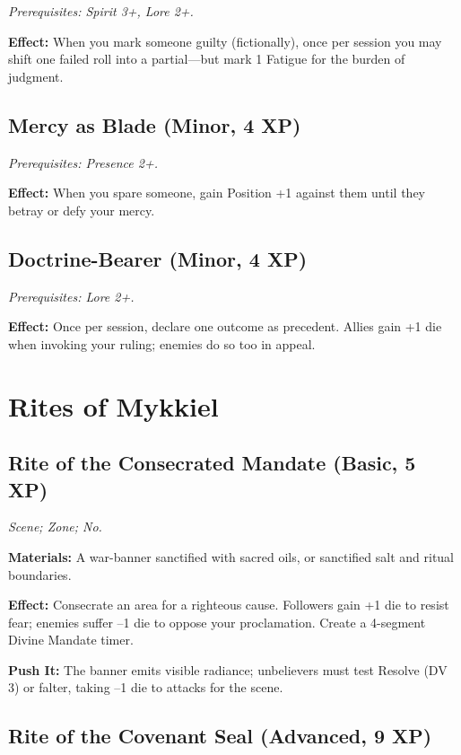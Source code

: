 \documentclass{book}
\begin{document}
\emph{Prerequisites: Spirit 3+, Lore 2+.}

\textbf{Effect:} When you mark someone guilty (fictionally), once per session you may shift one failed roll into a partial---but mark 1 Fatigue for the burden of judgment.

\subsection{Mercy as Blade (Minor, 4 XP)}

\emph{Prerequisites: Presence 2+.}

\textbf{Effect:} When you spare someone, gain Position +1 against them until they betray or defy your mercy.

\subsection{Doctrine-Bearer (Minor, 4 XP)}

\emph{Prerequisites: Lore 2+.}

\textbf{Effect:} Once per session, declare one outcome as precedent. Allies gain +1 die when invoking your ruling; enemies do so too in appeal.

\section{Rites of Mykkiel}

\subsection{Rite of the Consecrated Mandate (Basic, 5 XP)}

\textit{Scene; Zone; No.}

\textbf{Materials:} A war-banner sanctified with sacred oils, or sanctified salt and ritual boundaries.

\textbf{Effect:} Consecrate an area for a righteous cause. Followers gain +1 die to resist fear; enemies suffer --1 die to oppose your proclamation. Create a 4-segment Divine Mandate timer.

\textbf{Push It:} The banner emits visible radiance; unbelievers must test Resolve (DV 3) or falter, taking --1 die to attacks for the scene.

\subsection{Rite of the Covenant Seal (Advanced, 9 XP)}
\end{document}
